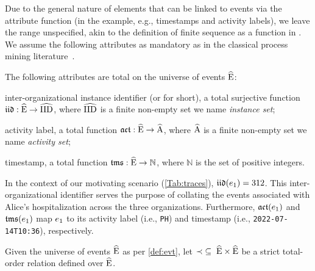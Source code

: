 \begin{newj}
Due to the general nature of elements that can be linked to events via the attribute function (in the example, e.g., timestamps and activity labels), we leave the range unspecified, akin to the definition of finite sequence as a function in \cite{Mendelson/2015:IntroductionMathematicalLogic}. We assume the following attributes as mandatory as in the classical process mining literature~\cite{Aalst/2016:ProcessMiningBook:DataScienceinAction}.
%
\begin{assumption}\label{asm:attribute}
	The following attributes are total on the universe of events $\widehat{\mathrm{E}}$:
	\begin{inparadesc}
		\item[inter-organizational instance identifier] (or {\CId} for short), a total surjective function $\mathfrak{iid} : \widehat{\mathrm{E}} \to \widehat{\mathrm{IID}}$, where $\widehat{\mathrm{IID}}$ is a finite non-empty set we name \emph{instance set};
		\item[activity label\textnormal{,}] a total function $\mathfrak{act} : \widehat{\mathrm{E}} \to \widehat{\mathrm{A}}$, where $\widehat{\mathrm{A}}$ is a finite non-empty set we name \emph{activity set};
		\item[timestamp\textnormal{,}] a total function $\mathfrak{tms} : \widehat{\mathrm{E}} \to \mathbb{N}$, where $\mathbb{N}$ is the set of positive integers.
	\end{inparadesc}
\end{assumption}
%
In the context of our motivating scenario (\cref{Tab:traces}), %
$\mathfrak{iid}(e_1) = 312$. This inter-organizational identifier serves the purpose of collating the events associated with Alice's hospitalization across the three organizations. Furthermore, %
{$\mathfrak{act}(e_1)$} and {$\mathfrak{tms}(e_1)$} map $e_1$ to its activity label (i.e., \texttt{PH}) and timestamp (i.e., \texttt{2022-07-14T10:36}), respectively.
%
\begin{definition}\label{def:evt:log}
	Given the universe of events $\widehat{\mathrm{E}}$ as per \cref{def:evt}, let ${\prec \;\subseteq\; \widehat{\mathrm{E}} \times \widehat{\mathrm{E}}}$ be a strict total-order relation defined over $\widehat{\mathrm{E}}$.

\end{definition}
\end{newj}
